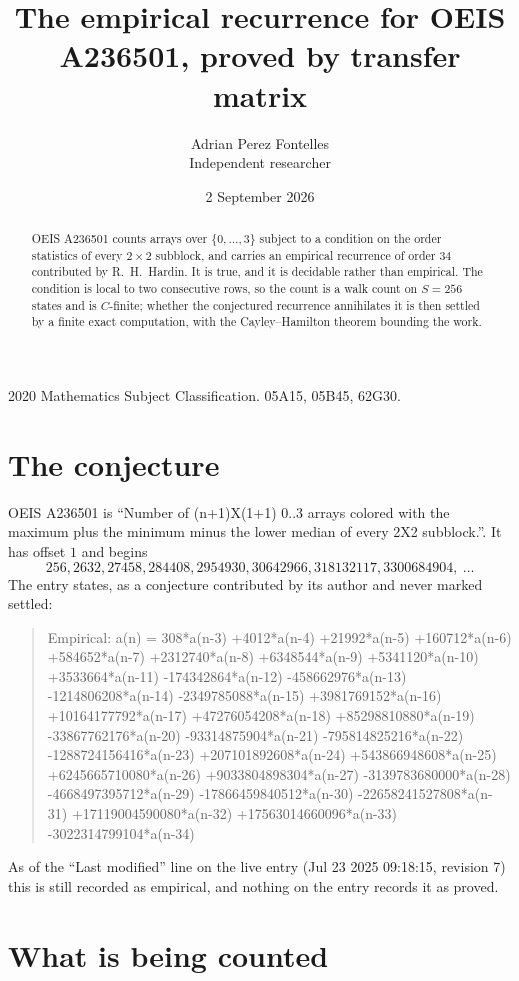 \documentclass[11pt,a4paper]{article}
\title{The empirical recurrence for OEIS A236501, proved by transfer matrix}
\author{Adrian Perez Fontelles\\ \small Independent researcher}
\date{2 September 2026}
\theoremstyle{plain}
\theoremstyle{definition}
\begin{document}
\maketitle

\begin{abstract}
OEIS A236501 counts arrays over $\{0,\dots,3\}$ subject to a condition on the order
statistics of every $2\times2$ subblock, and carries an empirical recurrence of order
$34$ contributed by R.~H.~Hardin. It is true, and it is decidable rather than empirical.
The condition is local to two consecutive rows, so the count is a walk count on $S=256$
states and is $C$-finite; whether the conjectured recurrence annihilates it is then settled by
a finite exact computation, with the Cayley--Hamilton theorem bounding the work.
\end{abstract}

\noindent\small 2020 Mathematics Subject Classification. 05A15, 05B45, 62G30.\normalsize

\section{The conjecture}

OEIS A236501 is ``Number of (n+1)X(1+1) 0..3 arrays colored with the maximum plus the minimum minus the lower median of every 2X2 subblock.''. It has offset $1$ and begins
\[
256, 2632, 27458, 284408, 2954930, 30642966, 318132117, 3300684904,\ \dots
\]
The entry states, as a conjecture contributed by its author and never marked settled:
\begin{quote}
Empirical: a(n) = 308*a(n-3) +4012*a(n-4) +21992*a(n-5) +160712*a(n-6) +584652*a(n-7) +2312740*a(n-8) +6348544*a(n-9) +5341120*a(n-10) +3533664*a(n-11) -174342864*a(n-12) -458662976*a(n-13) -1214806208*a(n-14) -2349785088*a(n-15) +3981769152*a(n-16) +10164177792*a(n-17) +47276054208*a(n-18) +85298810880*a(n-19) -33867762176*a(n-20) -93314875904*a(n-21) -795814825216*a(n-22) -1288724156416*a(n-23) +207101892608*a(n-24) +543866948608*a(n-25) +6245665710080*a(n-26) +9033804898304*a(n-27) -3139783680000*a(n-28) -4668497395712*a(n-29) -17866459840512*a(n-30) -22658241527808*a(n-31) +17119004590080*a(n-32) +17563014660096*a(n-33) -3022314799104*a(n-34)
\end{quote}
As of the ``Last modified'' line on the live entry (Jul 23 2025 09:18:15, revision 7) this is still
recorded as empirical, and nothing on the entry records it as proved.

\section{What is being counted}
\end{document}
